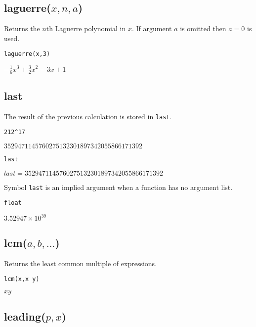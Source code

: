 \subsection*{laguerre($x,n,a$)}

Returns the $n$th Laguerre polynomial in $x$.
If argument $a$ is omitted then $a=0$ is used.

{\color{blue}
\begin{verbatim}
laguerre(x,3)
\end{verbatim}
}

\noindent
$\displaystyle -\tfrac{1}{6}x^3+\tfrac{3}{2}x^2-3x+1$

\subsection*{last}

The result of the previous calculation is stored in {\tt last}.

{\color{blue}
\begin{verbatim}
212^17
\end{verbatim}
}

\noindent
$3529471145760275132301897342055866171392$

{\color{blue}
\begin{verbatim}
last
\end{verbatim}
}

\noindent
$last=3529471145760275132301897342055866171392$

\bigskip
\noindent
Symbol {\tt last} is an implied argument when a function has no argument list.

{\color{blue}
\begin{verbatim}
float
\end{verbatim}
}

\noindent
$\displaystyle 3.52947\times10^{39}$

\subsection*{lcm($a,b,\ldots$)}

Returns the least common multiple of expressions.

{\color{blue}
\begin{verbatim}
lcm(x,x y)
\end{verbatim}
}

\noindent
$xy$

\subsection*{leading($p,x$)}

